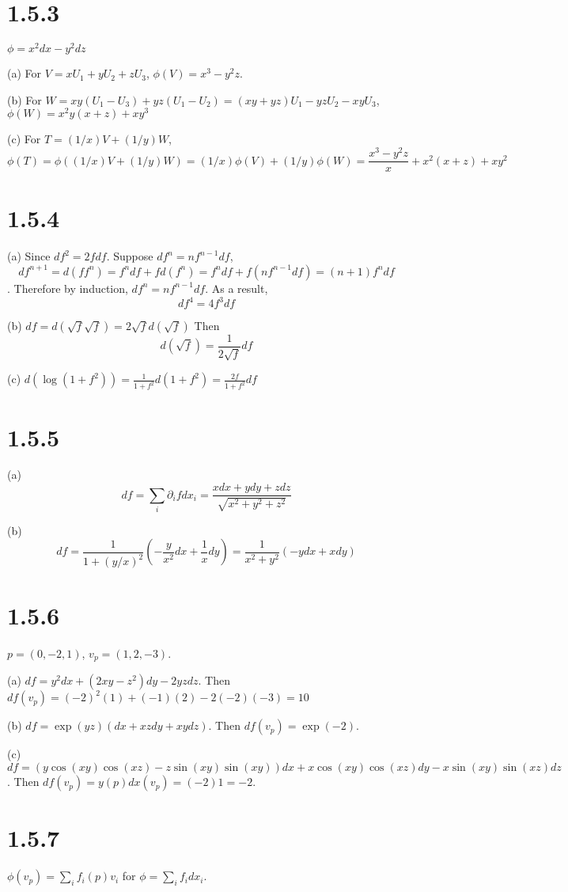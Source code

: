 \documentclass[12pt]{article}
\begin{document}
\section*{1.5.3}
$\phi = x^2dx - y^2dz$

(a) For $V=xU_1 + yU_2 + zU_3$,  $\phi(V) = x^3 - y^2z$.

(b) For $W= xy(U_1 - U_3) + yz(U_1 - U_2) = (xy+yz)U_1 - yzU_2 - xyU_3$, $\phi(W) = x^2y(x+z) +xy^3$

(c) For $T=(1/x)V + (1/y)W$,  $$\phi(T) = \phi((1/x)V + (1/y)W) = (1/x)\phi(V) + (1/y)\phi(W) = \frac{x^3-y^2z}{x} + x^2(x+z) + xy^2 $$

\section*{1.5.4}
(a) Since $df^2 = 2fdf$. Suppose $df^n = nf^{n-1}df$,  $$df^{n+1} = d(ff^n) = f^ndf + fd(f^n) = f^ndf + f(nf^{n-1}df) = (n+1)f^ndf$$. Therefore by induction, $df^n = nf^{n-1}df$.  As a result,
$$df^4 = 4f^3df$$

(b) $df = d(\sqrt{f} \sqrt{f}) =2 \sqrt{f}d (\sqrt{f})$ Then $$d (\sqrt{f}) = \frac{1}{2\sqrt{f}}df$$

(c) $d(\log(1+f^2)) = \frac{1}{1+f^2} d(1+f^2) = \frac{2f}{1+f^2} df$

\section*{1.5.5}
(a) $$df = \sum_i \partial_i f dx_i = \frac{xdx + ydy + zdz}{\sqrt{x^2+y^2+z^2}}$$

(b) $$ df = \frac{1}{1 + (y/x)^2} (-\frac{y}{x^2}dx + \frac{1}{x} dy) = \frac{1}{x^2 + y^2} (-ydx + xdy)$$

\section*{1.5.6}
$p = (0,-2, 1)$, $v_p=(1,2, -3)$.

(a) $df = y^2dx + (2xy-z^2) dy -2yzdz$. Then $df(v_p) = (-2)^2(1) + (-1)(2) -2(-2)(-3) = 10$

(b) $df = \exp(yz)(dx + xzdy + xydz)$. Then $df(v_p) = \exp(-2)$.

(c) $df = (y \cos(xy)\cos(xz) - z\sin(xy)\sin(xy))dx + x\cos(xy)\cos(xz)dy - x\sin(xy)\sin(xz)dz$. Then $df(v_p) = y(p)dx(v_p) = (-2)1 = -2$.

\section*{1.5.7}
$\phi(v_p) = \sum_i f_i(p) v_i$ for $\phi = \sum_i f_i dx_i$.
\end{document}

